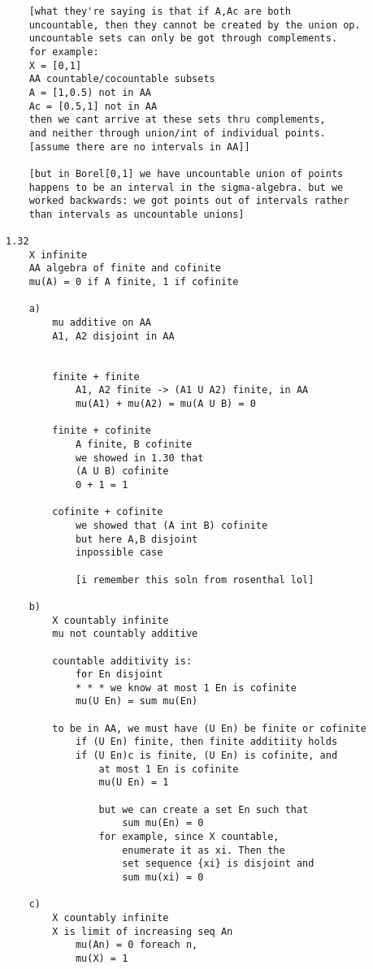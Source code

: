 \documentclass{article}
\begin{document}
\begin{flushleft}
\begin{verbatim}
    [what they're saying is that if A,Ac are both 
    uncountable, then they cannot be created by the union op.
    uncountable sets can only be got through complements. 
    for example:
    X = [0,1]
    AA countable/cocountable subsets 
    A = [1,0.5) not in AA 
    Ac = [0.5,1] not in AA 
    then we cant arrive at these sets thru complements, 
    and neither through union/int of individual points.
    [assume there are no intervals in AA]]

    [but in Borel[0,1] we have uncountable union of points 
    happens to be an interval in the sigma-algebra. but we 
    worked backwards: we got points out of intervals rather 
    than intervals as uncountable unions]

1.32
    X infinite 
    AA algebra of finite and cofinite 
    mu(A) = 0 if A finite, 1 if cofinite 

    a)
        mu additive on AA 
        A1, A2 disjoint in AA 


        finite + finite 
            A1, A2 finite -> (A1 U A2) finite, in AA 
            mu(A1) + mu(A2) = mu(A U B) = 0 

        finite + cofinite 
            A finite, B cofinite 
            we showed in 1.30 that 
            (A U B) cofinite 
            0 + 1 = 1 

        cofinite + cofinite
            we showed that (A int B) cofinite 
            but here A,B disjoint 
            inpossible case 

            [i remember this soln from rosenthal lol]

    b)
        X countably infinite 
        mu not countably additive 

        countable additivity is: 
            for En disjoint 
            * * * we know at most 1 En is cofinite 
            mu(U En) = sum mu(En)

        to be in AA, we must have (U En) be finite or cofinite 
            if (U En) finite, then finite additiity holds 
            if (U En)c is finite, (U En) is cofinite, and 
                at most 1 En is cofinite 
                mu(U En) = 1

                but we can create a set En such that 
                    sum mu(En) = 0
                for example, since X countable, 
                    enumerate it as xi. Then the 
                    set sequence {xi} is disjoint and 
                    sum mu(xi) = 0 

    c)
        X countably infinite 
        X is limit of increasing seq An 
            mu(An) = 0 foreach n, 
            mu(X) = 1


\end{verbatim}
\end{flushleft}
\end{document}
